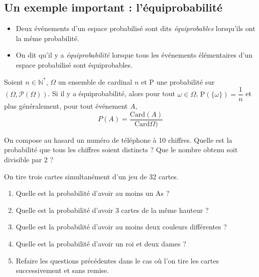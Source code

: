 \documentclass[french,11pt,twoside]{VcCours}
\renewcommand{\P}{\text{P}}
\begin{document}
\subsection{Un exemple important : l'équiprobabilité}

\begin{Definition}{}
 \begin{itemize}
 \item Deux événements d'un espace probabilisé sont dits \emph{équiprobables} lorsqu'ils ont la même probabilité.
\item On dit qu'il y a \emph{équiprobabilité} lorsque tous les événements élémentaires d'un espace probabilisé sont équiprobables.
 \end{itemize}
\end{Definition}

\begin{Theoreme}{}
 Soient $n \in \mathbb{N}^*$, $\Omega$ un ensemble de cardinal $n$ et $\P$ une probabilité sur $(\Omega,\mathcal{P}(\Omega))$. Si il y a équiprobabilité, alors pour tout $\omega \in \Omega$,
$ \P(\{\omega\}) = \dfrac 1n$ et plus généralement, pour tout événement $A$, 
$$P(A) = \frac{\textrm{Card}(A)}{\textrm{Card}\Omega)}$$
\end{Theoreme}

\begin{Exemple} On compose au hasard un numéro de téléphone à 10 chiffres. Quelle est la probabilité que tous les chiffres soient distincts ? Que le nombre obtenu soit divisible par 2 ?


  \newpage
\end{Exemple}

\begin{ApplicationDirecte}{}
On tire trois cartes simultanément d'un jeu de 32 cartes.
\begin{enumerate}
 \item Quelle est la probabilité d'avoir au moins un As ?
 \item Quelle est la probabilité d'avoir 3 cartes de la même hauteur ?
 \item Quelle est la probabilité d'avoir au moins deux couleurs différentes ?
 \item Quelle est la probabilité d'avoir un roi et deux dames ?
 \item Refaire les questions précédentes dans le cas où l'on tire les cartes successivement et sans remise.
\end{enumerate}
\end{ApplicationDirecte}
\end{document}
